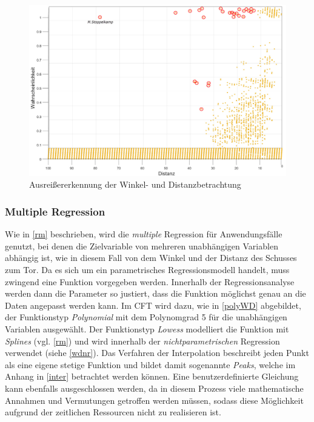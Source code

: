 \begin{figure}[H]
\centering
\includegraphics[scale=0.33]{se-wa-jpg/outlierWD}
\caption{Ausreißererkennung der Winkel- und Distanzbetrachtung}
\label{outlierWD}
\end{figure}

\subsubsection{Multiple Regression}
Wie in \vref{rm} beschrieben, wird die \textit{multiple} Regression für Anwendungsfälle genutzt, bei denen die Zielvariable von mehreren unabhängigen Variablen abhängig ist, wie in diesem Fall von dem Winkel und der Distanz des Schusses zum Tor. Da es sich um ein parametrisches Regressionsmodell handelt, muss zwingend eine Funktion vorgegeben werden. Innerhalb der Regressionsanalyse werden dann die Parameter so justiert, dass die Funktion möglichst genau an die Daten angepasst werden kann. Im CFT wird dazu, wie in \vref{polyWD} abgebildet, der Funktionstyp \textit{Polynomial} mit dem Polynomgrad \textsf{5} für die unabhängigen Variablen ausgewählt. Der Funktionstyp \textit{Lowess} modelliert die Funktion mit \textit{Splines} (vgl. \vref{rm}) und wird innerhalb der \textit{nichtparametrischen} Regression verwendet (siehe \vref{wdnr}). Das Verfahren der Interpolation beschreibt jeden Punkt als eine eigene stetige Funktion und bildet damit sogenannte \textit{Peaks}, welche im Anhang in \vref{inter} betrachtet werden können.\enlargethispage{\baselineskip} Eine benutzerdefinierte Gleichung kann ebenfalls ausgeschlossen werden, da in diesem Prozess viele mathematische Annahmen und Vermutungen getroffen werden müssen, sodass diese Möglichkeit aufgrund der zeitlichen Ressourcen nicht zu realisieren ist.

